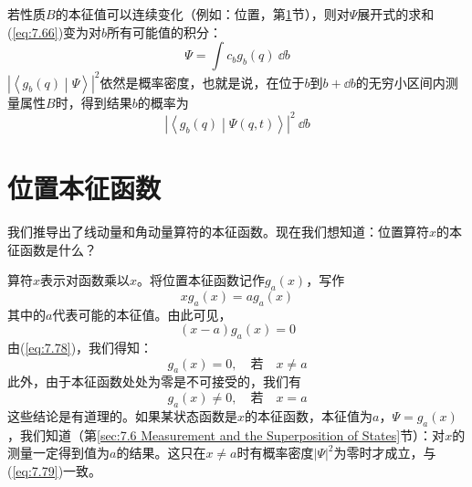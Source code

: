     若性质$B$的本征值可以连续变化（例如：位置，第\ref{sec:7.7 Position Eigenfunctions}节），则对$\Psi$展开式的求和(\ref{eq:7.66})变为对$b$所有可能值的积分：
    \begin{equation}
        \Psi = \int c_bg_b\left(q\right)\:\dd b
        \label{eq:7.75}
    \end{equation}
    $\left| \left\langle g_b\left(q\right) \middle| \Psi \right\rangle \right|^2$依然是概率密度，也就是说，在位于$b$到$b+\dd b$的无穷小区间内测量属性$B$时，得到结果$b$的概率为
    \begin{equation}
        \left| \left\langle g_b\left(q\right) \middle| \Psi\left(q,t\right) \right\rangle \right|^2\:\dd b
        \label{eq:7.76}
    \end{equation}

\section{位置本征函数}
\label{sec:7.7 Position Eigenfunctions}
    我们推导出了线动量和角动量算符的本征函数。现在我们想知道：位置算符$\hat{x}$的本征函数是什么？

    算符$\hat{x}$表示对函数乘以$x$。将位置本征函数记作$g_a\left(x\right)$，写作
    \begin{equation}
        xg_a\left(x\right) = a g_a\left(x\right)
        \label{eq:7.77}
    \end{equation}
    其中的$a$代表可能的本征值。由此可见，
    \begin{equation}
        \left(x-a\right)g_a\left(x\right) = 0
        \label{eq:7.78}
    \end{equation}
    由(\ref{eq:7.78})，我们得知：
    \begin{equation}
        g_a\left(x\right) = 0, \quad \text{若} \quad x \neq a
        \label{eq:7.79}
    \end{equation}
    此外，由于本征函数处处为零是不可接受的，我们有
    \begin{equation}
        g_a\left(x\right) \neq 0, \quad \text{若} \quad x = a
        \label{eq:7.80}
    \end{equation}
    这些结论是有道理的。如果某状态函数是$\hat{x}$的本征函数，本征值为$a$，$\Psi = g_a\left(x\right)$，我们知道（第\ref{sec:7.6 Measurement and the Superposition of States}节）：对$x$的测量一定得到值为$a$的结果。这只在$x \neq a$时有概率密度$\left|\Psi\right|^2$为零时才成立，与(\ref{eq:7.79})一致。


